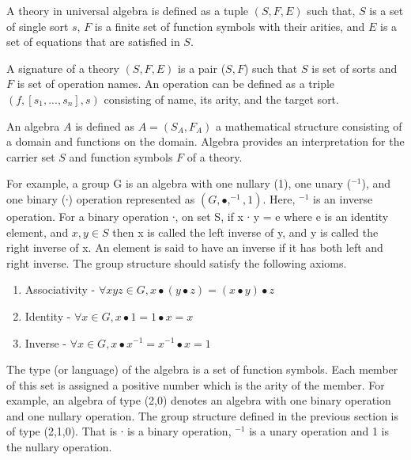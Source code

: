 A theory in universal algebra is defined as a tuple $(S,F,E)$ such that, $S$ is
a set of single sort $s$, $F$ is a finite set of function symbols with their
arities, and $E$ is a set of equations that are satisfied in $S$.

A signature of a theory $(S,F,E)$ is a pair ($S,F$) such that $S$ is set of
sorts and $F$ is set of operation names. An operation can be defined as a triple
$(f,[s_1,...,s_n],s)$ consisting of name, its arity, and the target sort. 

An algebra $A$ is defined as $A = (S_A,F_A)$ a mathematical structure consisting
of a domain and functions on the domain. Algebra provides an interpretation for
the carrier set $S$ and function symbols $F$ of a theory.

For example, a group G is an algebra with one nullary (1), one unary
($^{-1}$), and one binary (∙) operation represented as $(G, ∙,
^{-1}, 1)$. Here, $^{-1}$ is an inverse operation.
For a binary operation ∙, on set S, if x ∙ y = e where e is an identity element,
and $x,y \in S$ then x is called the left inverse of y, and y is called the
right inverse of x. An element is said to have an inverse if it has both left
and right inverse. The group structure should satisfy the following axioms. 
\begin{enumerate}
\item Associativity - \( ∀ x y z \in G, x ∙ (y ∙ z) = (x ∙ y) ∙ z \)
\item Identity - \(∀ x \in G, x ∙ 1 = 1 ∙ x = x\)
\item Inverse - \( ∀ x \in G, x ∙ x ^{-1} =  x
^{-1} ∙ x = 1\)
\end{enumerate}

The type (or language) of the algebra is a set of function symbols. Each member
of this set is assigned a positive number which is the arity of the member. For
example, an algebra of type (2,0) denotes an algebra with one binary operation
and one nullary operation. The group structure defined in the previous section
is of type (2,1,0). That is ∙ is a binary operation, $^{-1}$ is a
unary operation and 1 is the nullary operation.

